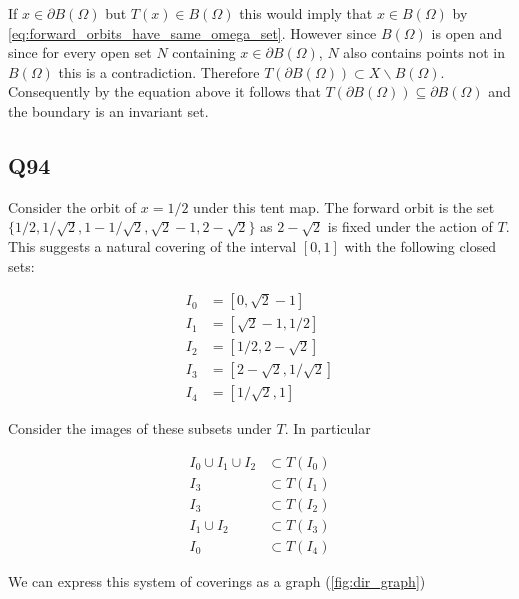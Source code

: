 \documentclass{article}
\begin{document}
If $x \in \partial B(\Omega)$ but $T(x) \in B(\Omega)$ this would imply that $x \in B(\Omega)$ by \ref{eq:forward_orbits_have_same_omega_set}. 
However since $B(\Omega)$ is open and since for every open set $N$ containing $x \in \partial B(\Omega)$, $N$ also contains 
points not in $B(\Omega)$ this is a contradiction. Therefore $T(\partial B(\Omega)) \subset X\backslash B(\Omega)$. Consequently 
by the equation above it follows that $T(\partial B(\Omega)) \subseteq \partial B(\Omega)$ and the 
boundary is an invariant set.

\subsection*{Q94}
Consider the orbit of $x = 1/2$ under this tent map. The forward orbit is the set $\{1/2,1/\sqrt{2},1-1/\sqrt{2},\sqrt{2}-1,2-\sqrt{2}\}$ 
as $2 - \sqrt{2}$ is fixed under the action of $T$. This suggests a natural covering of the 
interval $[0,1]$ with the following closed sets:

\begin{align*}
	I_0 &= [0,\sqrt{2}-1] \\
	I_1 &= [\sqrt{2}-1,1/2] \\
	I_2 &= [1/2,2-\sqrt{2}] \\
	I_3 &= [2-\sqrt{2},1/\sqrt{2}] \\
	I_4 &= [1/\sqrt{2},1]
\end{align*}

Consider the images of these subsets under $T$. In particular 

\begin{align*}
	I_0 \cup I_1 \cup I_2 &\subset T(I_0) \\
	I_3 &\subset T(I_1) \\
	I_3 &\subset T(I_2) \\
	I_1 \cup I_2 &\subset T(I_3) \\
	I_0 &\subset T(I_4)
\end{align*}

We can express this system of coverings as a graph (\autoref{fig:dir_graph})
\end{document}
